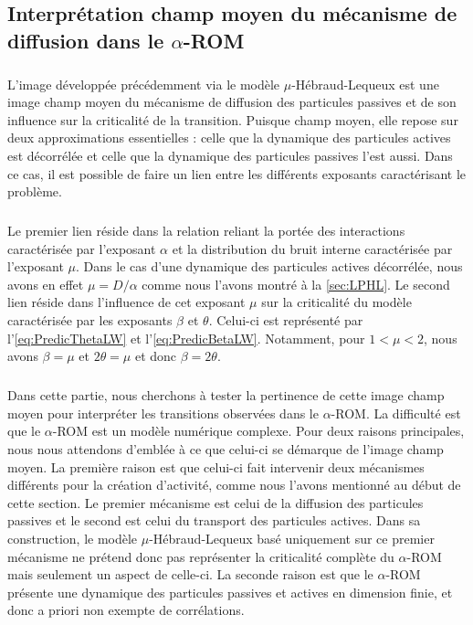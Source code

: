 \subsection{Interprétation champ moyen du mécanisme de diffusion dans le $\alpha$-ROM}

\subparagraph{}L'image développée précédemment via le modèle $\mu$-Hébraud-Lequeux est une image champ moyen du mécanisme de diffusion des particules passives et de son influence sur la criticalité de la transition. Puisque champ moyen, elle repose sur deux approximations essentielles : celle que la dynamique des particules actives est décorrélée et celle que la dynamique des particules passives l'est aussi. Dans ce cas, il est possible de faire un lien entre les différents exposants caractérisant le problème.

\subparagraph{}Le premier lien réside dans la relation reliant la portée des interactions caractérisée par l'exposant $\alpha$ et la distribution du bruit interne caractérisée par l'exposant $\mu$. Dans le cas d'une dynamique des particules actives décorrélée, nous avons en effet $\mu = D/\alpha$ comme nous l'avons montré à la \autoref{sec:LPHL}. Le second lien réside dans l'influence de cet exposant $\mu$ sur la criticalité du modèle caractérisée par les exposants $\beta$ et $\theta$. Celui-ci est représenté par l'\autoref{eq:PredicThetaLW} et l'\autoref{eq:PredicBetaLW}. Notamment, pour $1<\mu<2$, nous avons $\beta = \mu$ et $2\theta = \mu$ et donc $\beta = 2\theta$. 

\subparagraph{}Dans cette partie, nous cherchons à tester la pertinence de cette image champ moyen pour interpréter les transitions observées dans le $\alpha$-ROM. La difficulté est que le $\alpha$-ROM est un modèle numérique complexe. Pour deux raisons principales, nous nous attendons d'emblée à ce que celui-ci se démarque de l'image champ moyen. La première raison est que celui-ci fait intervenir deux mécanismes différents pour la création d'activité, comme nous l'avons mentionné au début de cette section. Le premier mécanisme est celui de la diffusion des particules passives et le second est celui du transport des particules actives. Dans sa construction, le modèle $\mu$-Hébraud-Lequeux basé uniquement sur ce premier mécanisme ne prétend donc pas représenter la criticalité complète du $\alpha$-ROM mais seulement un aspect de celle-ci. La seconde raison est que le $\alpha$-ROM présente une dynamique des particules passives et actives en dimension finie, et donc a priori non exempte de corrélations. 

